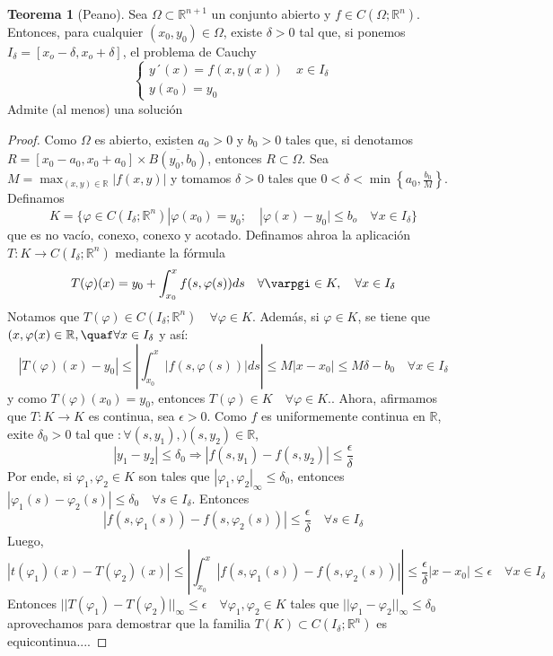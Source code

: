 \documentclass[11pt]{article}
\theoremstyle{definition} %
\newtheorem{theorem}{Teorema}[section]
\newcommand{\R}{\mathbb{R}}
\begin{document}
\begin{theorem}[Peano] Sea $\Omega \subset \R^{n+1}$ un conjunto abierto y $f \in C(\Omega;\R^n)$. Entonces, para cualquier $(x_0,y_0)\in \Omega$, existe $\delta>0$ tal que, si ponemos $I_{\delta}=[x_o-\delta,x_o+\delta]$, el problema de Cauchy
  \[
    \begin{cases}
      y´(x)=f(x,y(x)) \quad x \in I_{\delta} \\ y(x_0)=y_0
    \end{cases}
  \]
  Admite (al menos) una solución
\end{theorem}

\begin{proof}
  Como $\Omega$ es abierto, existen $a_0>0$ y $b_0>0$ tales que, si denotamos $R=[x_0-a_0,x_0+a_0]\times \overline{B(y_0,b_0)}$, entonces $R \subset \Omega$. Sea $M=\max_{(x,y)\in \R}|f(x,y)|$ y tomamos $\delta > 0$ tales que $0 < \delta < \min\left\{a_0, \frac{b_0}{M}\right\}$. Definamos 
  \[  K=\{\varphi \in C(I_{\delta};\R^n)| \varphi(x_0)=y_0;\quad |\varphi(x)-y_0|\leq b_o \quad \forall x \in I_{\delta}\}\]
  que es no vacío, conexo, conexo y acotado. Definamos ahroa la aplicación $T:K\rightarrow C(I_{\delta};\R^n)$ mediante la fórmula 
  \[ T(\varphi)(x)=y_0 + \int_{x_0}^{x} f(s,\varphi(s))ds \quad \forall \varpgi \in K, \quad \forall x \in I_{\delta}\]
  Notamos que $T(\varphi)\in C(I_{\delta};\R^n) \quad \forall \varphi \in K$. Además, si $\varphi \in K$, se tiene que $(x,\varphi(x)\in \R, \quaf \forall x \in I_{\delta}$ y así:
  \[ |T(\varphi)(x)-y_0|\leq \left| \int_{x_0}^{x}|f(s,\varphi(s))|ds \right| \leq M|x-x_0|\leq M\delta -b_0 \quad \forall x \in I_{\delta} \]
  y como $T(\varphi)(x_0)=y_0$, entonces $T(\varphi)\in K\quad \forall \varphi \in K.$. Ahora, afirmamos que $T:K\rightarrow K$ es continua, sea $\epsilon >0$. Como $f$ es uniformemente continua en $\R$, exite $\delta_0 >0$ tal que $:\forall(s,y_1),)(s,y_2)\in \R$, 
  \[|y_1-y_2|\leq \delta_0 \Rightarrow |f(s,y_1)-f(s,y_2)|\leq \frac{\epsilon}{\delta}\]
  Por ende, si $\varphi_1,\varphi_2 \in K$ son tales que $|\varphi_1,\varphi_2|_{\infty}\leq \delta_0$, entonces $|\varphi_1(s)-\varphi_2(s)|\leq \delta_0\quad \forall s \in I_{\delta}$. Entonces 
  \[ |f(s,\varphi_1(s))-f(s,\varphi_2(s))|\leq \frac{\epsilon}{\delta}\quad \forall s \in I_{\delta} \]
  Luego,
  \[|t(\varphi_1)(x)-T(\varphi_2)(x)|\leq \left|\int_{x_0}^{x}|f(s,\varphi_1(s))-f(s,\varphi_2(s))|\right| \leq \frac{\epsilon}{\delta}|x-x_0|\leq \epsilon \quad \forall x \in I_{\delta}\]
  Entonces $||T(\varphi_1)-T(\varphi_2)||_{\infty}\leq \epsilon \quad \forall \varphi_1,\varphi_2\in K$ tales que $||\varphi_1 -\varphi_2||_{\infty} \leq \delta_0$ aprovechamos para demostrar que la familia $T(K)\subset C(I_{\delta};\R^n)$ es equicontinua....  
  
\end{proof}
\end{document}
